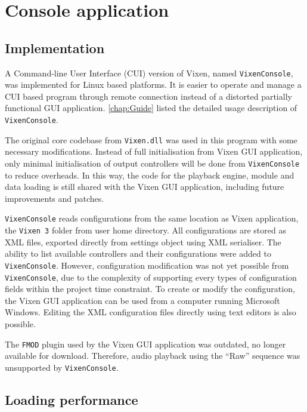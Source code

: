 \chapter{Console application}
\renewcommand{\baselinestretch}{\mystretch}
\label{chap:Console}

\section{Implementation}

A Command-line User Interface (CUI) version of Vixen, named \texttt{VixenConsole}, was implemented for Linux based platforms. It is easier to operate and manage a CUI based program through remote connection instead of a distorted partially functional GUI application. \cref{chap:Guide} listed the detailed usage description of \texttt{VixenConsole}.

The original core codebase from \texttt{Vixen.dll} was used in this program with some necessary modifications. Instead of full initialisation from Vixen GUI application, only minimal initialisation of output controllers will be done from \texttt{VixenConsole} to reduce overheads. In this way, the code for the playback engine, module and data loading is still shared with the Vixen GUI application, including future improvements and patches.

\texttt{VixenConsole} reads configurations from the same location as Vixen application, the \texttt{Vixen 3} folder from user home directory. All configurations are stored as XML files, exported directly from settings object using XML serialiser. The ability to list available controllers and their configurations were added to \texttt{VixenConsole}. However, configuration modification was not yet possible from \texttt{VixenConsole}, due to the complexity of supporting every types of configuration fields within the project time constraint. To create or modify the configuration, the Vixen GUI application can be used from a computer running Microsoft Windows. Editing the XML configuration files directly using text editors is also possible.

The \texttt{FMOD} plugin used by the Vixen GUI application was outdated, no longer available for download. Therefore, audio playback using the ``Raw'' sequence was unsupported by \texttt{VixenConsole}.

\section{Loading performance}

